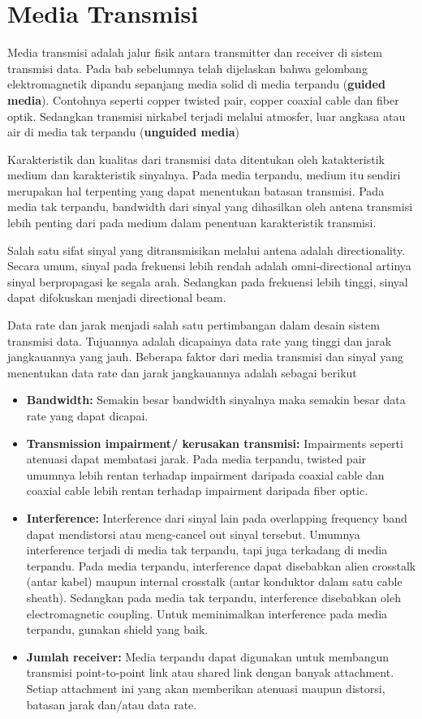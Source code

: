 \chapter{Media Transmisi}

Media transmisi adalah jalur fisik antara transmitter dan receiver di sistem transmisi data. Pada bab sebelumnya telah dijelaskan bahwa gelombang elektromagnetik dipandu sepanjang media solid di media terpandu (\textbf{guided media}). Contohnya seperti copper twisted pair, copper coaxial cable dan fiber optik. Sedangkan transmisi nirkabel terjadi melalui atmosfer, luar angkasa atau air di media tak terpandu (\textbf{unguided media})

Karakteristik dan kualitas dari transmisi data ditentukan oleh katakteristik medium dan karakteristik sinyalnya. Pada media terpandu, medium itu sendiri merupakan hal terpenting yang dapat menentukan batasan transmisi. Pada media tak terpandu, bandwidth dari sinyal yang dihasilkan oleh antena transmisi lebih penting dari pada medium dalam penentuan karakteristik transmisi.

Salah satu sifat sinyal yang ditransmisikan melalui antena adalah directionality. Secara umum, sinyal pada frekuensi lebih rendah adalah omni-directional artinya sinyal berpropagasi ke segala arah. Sedangkan pada frekuensi lebih tinggi, sinyal dapat difokuskan menjadi directional beam.

Data rate dan jarak menjadi salah satu pertimbangan dalam desain sistem transmisi data. Tujuannya adalah dicapainya data rate yang tinggi dan jarak jangkauannya yang jauh.  Beberapa faktor dari media transmisi dan sinyal yang menentukan data rate dan jarak jangkauannya adalah sebagai berikut

\begin{itemize}
	\item \textbf{Bandwidth:} Semakin besar bandwidth sinyalnya maka semakin besar data rate yang dapat dicapai.
	\item \textbf{Transmission impairment/ kerusakan transmisi: } Impairments seperti atenuasi dapat membatasi jarak. Pada media terpandu, twisted pair umumnya lebih rentan terhadap impairment daripada coaxial cable dan coaxial cable lebih rentan terhadap impairment daripada fiber optic.
	\item \textbf{Interference:} Interference dari sinyal lain pada overlapping frequency band dapat mendistorsi atau meng-cancel out sinyal tersebut. Umumnya interference terjadi di media tak terpandu, tapi juga terkadang di media terpandu. Pada media terpandu, interference dapat disebabkan alien crosstalk (antar kabel) maupun internal crosstalk (antar konduktor dalam satu cable sheath). Sedangkan pada media tak terpandu, interference disebabkan oleh electromagnetic coupling. Untuk meminimalkan interference pada media terpandu, gunakan shield yang baik.
	\item \textbf{Jumlah receiver:} Media terpandu dapat digunakan untuk membangun transmisi point-to-point link atau shared link dengan banyak attachment. Setiap attachment ini yang akan memberikan atenuasi maupun distorsi, batasan jarak dan/atau data rate.
\end{itemize}

